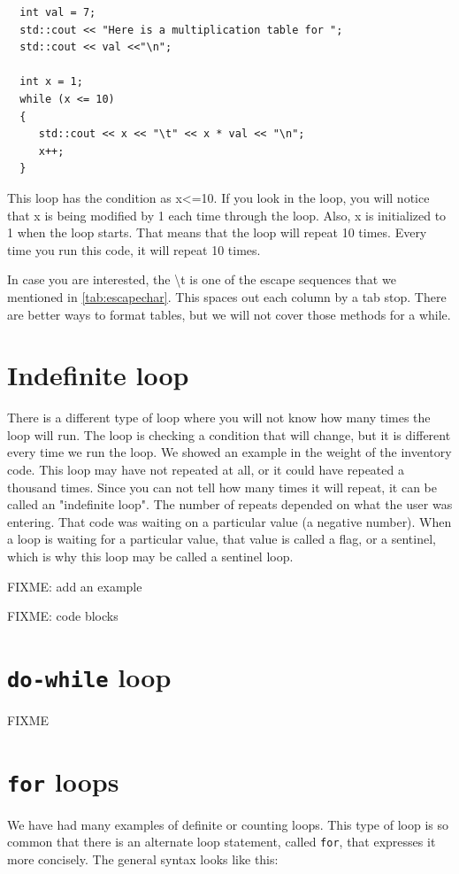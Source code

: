 \begin{lstlisting}
  int val = 7;
  std::cout << "Here is a multiplication table for ";
  std::cout << val <<"\n";
  
  int x = 1;
  while (x <= 10)
  {
     std::cout << x << "\t" << x * val << "\n";
     x++;
  }
\end{lstlisting}
This loop has the condition as x<=10. If you look in the loop, you will notice that
x is being modified by 1 each time through the loop. Also, x is initialized to 1
when the loop starts. That means that the loop will repeat 10 times. Every time you
run this code, it will repeat 10 times.

In case you are interested, the \textbackslash t is one of the escape sequences that
we mentioned in \ref{tab:escapechar}. This spaces out each column by a tab stop. There 
are better ways to format tables, but we will not cover those methods for a while.

\section{Indefinite loop}
There is a different type of loop where you will not know how many times the loop
will run. The loop is checking a condition that will change, but it is different every
time we run the loop. We showed an example in the weight of the inventory code. This 
loop may have not repeated at all, or it could have repeated a thousand times. Since
you can not tell how many times it will repeat, it can be called an "indefinite loop". 
The number of repeats depended on what the user was entering. That code was waiting on a particular value (a negative number).
When a loop is waiting for a particular value, that value is called a flag, or a sentinel, which is why this loop may be
called a sentinel loop. 

FIXME: add an example

FIXME: code blocks
\section{{\tt do-while} loop}
FIXME

\section{{\tt for} loops}
We have had many examples of definite or counting loops.
This type of loop is so common that there is an alternate
loop statement, called {\tt for}, that expresses it more
concisely.  The general syntax looks like this:

